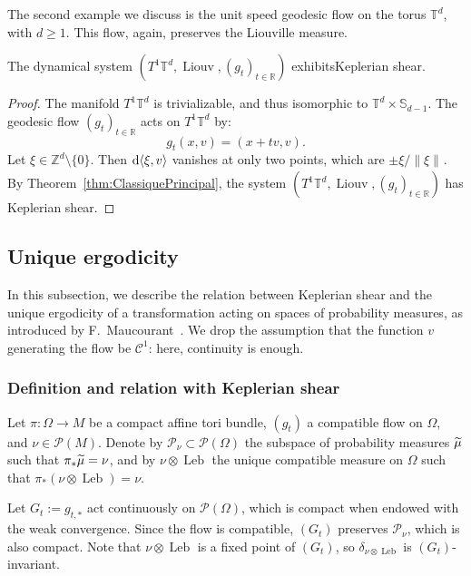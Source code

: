 \documentclass[AHL,Unicode,longabstracts]{cedram}
\DeclareMathOperator{\Leb}{Leb}
\DeclareMathOperator{\Liouv}{Liouv}
\newcommand{\Z}{\mathbb{Z}}
\newcommand{\R}{\mathbb{R}}
\newcommand{\Sbb}{\mathbb{S}}
\newcommand{\Tbb}{\mathbb{T}}
\newcommand{\Ccal}{\mathcal{C}}
\newcommand{\Pcal}{\mathcal{P}}
\newcommand{\de}{{\rm d}}
\newcommand{\norm}[2]{\left\| #1 \right\|_{#2}}
\let\oldtilde\tilde
\renewcommand*{\tilde}[1]{\mathchoice{\widetilde{#1}}{\widetilde{#1}}{\oldtilde{#1}}{\oldtilde{#1}}}\let\oldhat\hat
\renewcommand*{\hat}[1]{\mathchoice{\widehat{#1}}{\widehat{#1}}{\oldhat{#1}}{\oldhat{#1}}}\let\oldforall\forall
\renewcommand*{\forall}{\mathrel{\oldforall}}
\begin{document}
The second example we discuss is the unit speed geodesic flow on the torus $\Tbb^d$, with $d \geq 1$. This flow, again, preserves the Liouville measure.

\begin{prop}\label{prop:FlotToreCisaillement}
The dynamical system $(T^1 \Tbb^d, \Liouv, (g_t)_{t \in \R})$ exhibits\linebreak Keplerian shear.
\end{prop}


\begin{proof}%
The manifold $T^1 \Tbb^d$ is trivializable, and thus isomorphic to $\Tbb^d\times \Sbb_{d-1}$. The geodesic flow $(g_t)_{t \in \R}$ acts on $T^1 \Tbb^d$ by:
\[
g_t (x,v) = (x+tv, v).
\]
Let $\xi \in \Z^d \setminus \{0\}$. Then $\de \langle \xi, v \rangle$ vanishes at only two points, which are $\pm \xi / \norm{\xi}{}$. By Theorem~\ref{thm:ClassiquePrincipal}, the system $(T^1 \Tbb^d, \Liouv, (g_t)_{t \in \R})$ has Keplerian shear.
\end{proof}


\subsection{Unique ergodicity}\label{subsec:UniqueErgodicite}

In this subsection, we describe the relation between Keplerian shear and the unique ergodicity of a transformation acting on spaces of probability measures, as introduced by F.~Maucourant~\cite{Maucourant:2016}. We drop the assumption that the function $v$ generating the flow be $\Ccal^1$: here, continuity is enough.

\subsubsection{Definition and relation with Keplerian shear}

Let $\pi : \Omega \to M$ be a compact affine tori bundle, $(g_t)$ a compatible flow on $\Omega$, and $\nu \in \Pcal (M)$. Denote by $\Pcal_\nu \subset \Pcal (\Omega)$ the subspace of probability measures $\tilde{\mu}$ such that $\pi_* \tilde{\mu} = \nu$, and by $\nu \otimes \Leb$ the unique compatible measure on $\Omega$ such that $\pi_* (\nu \otimes \Leb) = \nu$.


Let $G_t := g_{t,*}$ act continuously on $\Pcal (\Omega)$, which is compact when endowed with the weak convergence. Since the flow is compatible, $(G_t)$ preserves $\Pcal_\nu$, which is also compact. Note that $\nu \otimes \Leb$ is a fixed point of $(G_t)$, so $\delta_{\nu \otimes \Leb}$ is $(G_t)$-invariant.
\end{document}

